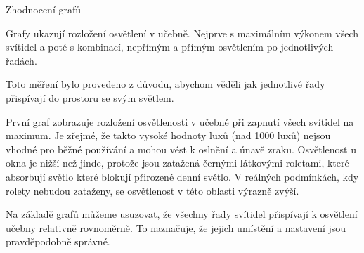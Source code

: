 
\secc Zhodnocení grafů

Grafy ukazují rozložení osvětlení v učebně. Nejprve s maximálním výkonem všech svítidel a poté s kombinací,
nepřímým a přímým osvětlením po jednotlivých řadách.



Toto měření bylo provedeno z důvodu, abychom věděli jak jednotlivé řady přispívají do prostoru se svým světlem.

\medskip {}

První graf zobrazuje rozložení osvětlenosti v učebně při zapnutí všech svítidel na maximum. Je zřejmé, že takto vysoké hodnoty luxů (nad 1000 luxů)
nejsou vhodné pro běžné používání a mohou vést k oslnění a únavě zraku.
Osvětlenost u okna je nižší než jinde, protože jsou zatažená černými látkovými roletami,
které absorbují světlo které blokují přirozené denní světlo.
V reálných podmínkách, kdy rolety nebudou zataženy, se osvětlenost v této oblasti výrazně zvýší.


\medskip {}


Na základě grafů můžeme usuzovat, že všechny řady svítidel přispívají k osvětlení učebny relativně rovnoměrně.
To naznačuje, že jejich umístění a nastavení jsou pravděpodobně správné.

